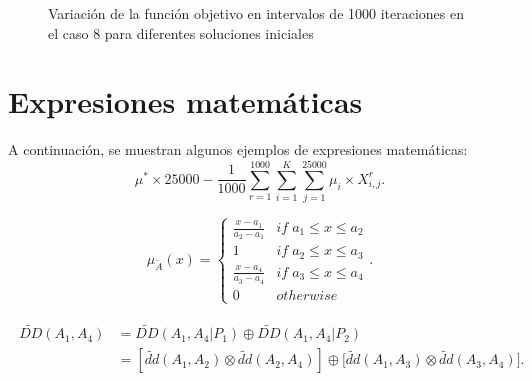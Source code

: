\begin{figure}[!ht]
	\centering
	
	\caption{Variación de la función objetivo en intervalos de 1000 iteraciones en el caso 8 para diferentes soluciones iniciales}
	\label{fig:variacion_fitness}
\end{figure}

\section{Expresiones matemáticas}
A continuación, se muestran algunos ejemplos de expresiones matemáticas:
\begin{equation}
\mu^*\times 25000-\frac{1}{1000}\sum_{r=1}^{1000}\sum_{i=1}^{K}\sum_{j=1}^{25000}\mu_i\times X_{i,j}^r.
\end{equation}

\begin{equation}
\mu_{\widetilde{A}}(x)=\left\{ \begin{array}{cc}
\frac{x-a_{1}}{a_{2}-a_{1}} & if\; a_{1}\leq x\leq a_{2}\\
1 & if\; a_{2}\leq x\leq a_{3}\\
\frac{x-a_{4}}{a_{3}-a_{4}} & if\; a_{3}\leq x\leq a_{4}\\
0 & otherwise
\end{array}\right. .
\end{equation}

\begin{align}
\begin{split}
\widetilde{DD}(A_{1},A_{4}) & =\widetilde{DD}(A_{1},A_{4}|P_{1})\oplus \widetilde{DD}(A_{1},A_{4}|P_{2}) \\ 
& =[\widetilde{dd}(A_{1},A_{2})\otimes \widetilde{dd}(A_{2},A_{4})]\oplus \lbrack \widetilde{dd}(A_{1},A_{3})\otimes \widetilde{dd}(A_{3},A_{4})].
\end{split}
\end{align}

